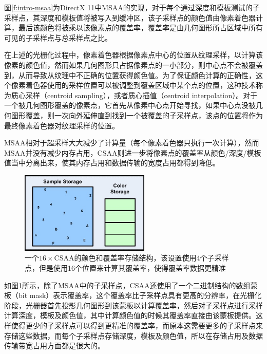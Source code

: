 图\ref{f:intro-msaa}为DirectX 11中MSAA的实现，对于每个通过深度和模板测试的子采样点，其深度和模板值将被写入到缓冲区，该子采样点的颜色值由像素着色器计算，最后该颜色将被乘以该像素点的覆盖率，覆盖率是由几何图形所占区域中所有可见的子采样点与总采样点之比。

在上述的光栅化过程中，像素着色器根据像素点中心的位置从纹理采样，以计算该像素的颜色值，然而如果几何图形只占据像素点的一小部分，则中心点不会被覆盖到，从而导致从纹理中不正确的位置获得颜色值。为了保证颜色计算的正确性，这个像素着色器使用的采样位置可以被调整到覆盖区域中某个点的位置，这种技术称为质心采样（centroid sampling），或者质心插值（centroid interpolation）。对于一个被几何图形覆盖的像素点，它首先从像素中心点开始寻找，如果中心点没被几何图形覆盖，则一次向外延伸直到找到一个被覆盖的子采样点，该点的位置将作为最终像素着色器对纹理采样的位置。

MSAA相对于超采样大大减少了计算量（每个像素着色器只执行一次计算），然而MSAA并没有减少内存占用，CSAA\cite{m:CoverageSamplingAntialiasing}则进一步将像素点的覆盖率从颜色/深度/模板值当中分离出来，使其内存占用和数据传输的宽度占用都得到降低。

\begin{figure}
\sidecaption
	\includegraphics[width=0.55\textwidth]{figures/intro/sample_coverage}
	\caption{一个$16\times$CSAA的颜色和覆盖率存储结构，该设置使用4个子采样点，但是使用16个位置来计算其覆盖率，使得覆盖率数据更精准}
	\label{f:intro-sample-coverage}
\end{figure}

如图\ref{f:intro-sample-coverage}所示，除了MSAA中的子采样点，CSAA还使用了一个二进制结构的数组蒙板（bit mask）表示覆盖率，这个覆盖率比子采样点具有更高的分辨率，在光栅化阶段，光栅器首先投影几何图形到该蒙板以计算覆盖率，然后对子采样点进行采样计算深度，模板及颜色值，其中计算颜色值的时候其覆盖率直接由该蒙板提供。这样使得更少的子采样点可以得到更精准的覆盖率，而原本这需要更多的子采样点来存储这些数据，而每个子采样点存储深度，模板及颜色值，所以在存储占用及数据传输带宽占用方面都是很大的。

